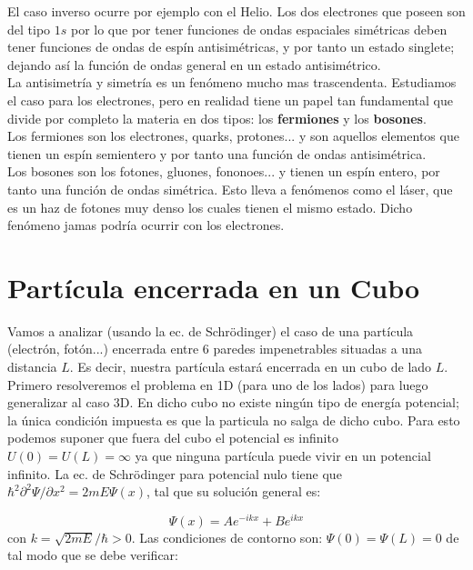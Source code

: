 \documentclass[12pt]{article}
\begin{document}
El caso inverso ocurre por ejemplo con el Helio. Los dos electrones que poseen son del tipo $1s$ por lo que por tener funciones de ondas espaciales simétricas deben tener funciones de ondas de espín antisimétricas, y por tanto un estado singlete; dejando así la función de ondas general en un estado antisimétrico.\\

La antisimetría y simetría es un fenómeno mucho mas trascendenta. Estudiamos el caso para los electrones, pero en realidad tiene un papel tan fundamental que divide por completo la materia en dos tipos: los \textbf{fermiones} y los \textbf{bosones}. \\

Los fermiones son los electrones, quarks, protones... y son aquellos elementos que tienen un espín semientero y por tanto una función de ondas antisimétrica. \\

Los bosones son los fotones, gluones, fononoes...  y tienen un espín entero, por tanto una función de ondas simétrica. Esto lleva a fenómenos como el láser, que es un haz de fotones muy denso los cuales tienen el mismo estado. Dicho fenómeno jamas podría ocurrir con los electrones. 


\section{Partícula encerrada en un Cubo \label{Sec:24}}

Vamos a analizar (usando la ec. de Schrödinger) el caso de una partícula (electrón, fotón...) encerrada entre 6 paredes impenetrables situadas a una distancia $L$. Es decir, nuestra partícula estará encerrada en un cubo de lado $L$. Primero resolveremos el problema en 1D (para uno de los lados) para luego generalizar al caso 3D. En dicho cubo no existe ningún tipo de energía potencial; la única condición impuesta es que la particula no salga de dicho cubo. Para esto podemos suponer que fuera del cubo el potencial es infinito $U(0)=U(L) = \infty$ ya que ninguna partícula puede vivir en un potencial infinito. La ec. de Schrödinger para potencial nulo tiene que $\hbar^2 \partial^2 \Psi / \partial x^2 = 2 m E \Psi (x)$, tal que su solución general es: 

\begin{equation}
\Psi (x) = A e^{-ikx} + B e^{ikx}
\end{equation}
con $k = \sqrt{2mE}/\hbar > 0 $. Las condiciones de contorno son: $\Psi(0) = \Psi(L) = 0$ de tal modo que se debe verificar:
\end{document}
